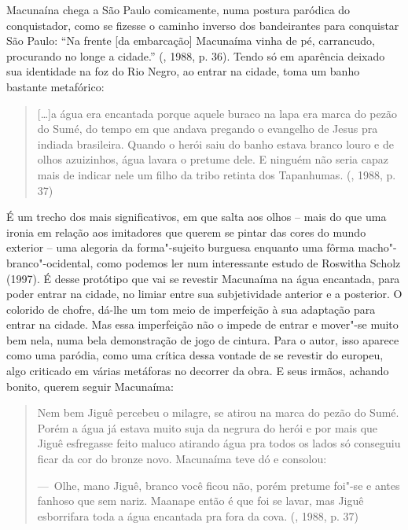 Macunaína chega a São Paulo comicamente, numa postura paródica do
conquistador, como se fizesse o caminho inverso dos bandeirantes para
conquistar São Paulo: ``Na frente [da embarcação] Macunaíma vinha de
pé, carrancudo, procurando no longe a cidade.'' (, 1988, p. 36).
Tendo só em aparência deixado sua identidade na foz do Rio Negro, ao
entrar na cidade, toma um banho bastante metafórico:

\begin{quote}
[\ldots{}]a água era encantada porque aquele buraco na lapa era marca do
pezão do Sumé, do tempo em que andava pregando o evangelho de Jesus pra
indiada brasileira. Quando o herói saiu do banho estava branco louro e
de olhos azuizinhos, água lavara o pretume dele. E ninguém não seria
capaz mais de indicar nele um filho da tribo retinta dos Tapanhumas.
(, 1988, p. 37)
\end{quote}

É um trecho dos mais significativos, em que salta aos olhos -- mais do
que uma ironia em relação aos imitadores que querem se pintar das cores
do mundo exterior -- uma alegoria da forma"-sujeito burguesa enquanto uma
fôrma macho"-branco"-ocidental, como podemos ler num interessante estudo
de Roswitha Scholz (1997). É desse protótipo que vai se revestir
Macunaíma na água encantada, para poder entrar na cidade, no limiar
entre sua subjetividade anterior e a posterior. O colorido de chofre,
dá-lhe um tom meio de imperfeição à sua adaptação para entrar na cidade.
Mas essa imperfeição não o impede de entrar e mover"-se muito bem nela,
numa bela demonstração de jogo de cintura. Para o autor, isso aparece
como uma paródia, como uma crítica dessa vontade de se revestir do
europeu, algo criticado em várias metáforas no decorrer da obra. E seus
irmãos, achando bonito, querem seguir Macunaíma:

\begin{quote}
Nem bem Jiguê percebeu o milagre, se atirou na marca do pezão do Sumé.
Porém a água já estava muito suja da negrura do herói e por mais que
Jiguê esfregasse feito maluco atirando água pra todos os lados só
conseguiu ficar da cor do bronze novo. Macunaíma teve dó e consolou:

---~Olhe, mano Jiguê, branco você ficou não, porém pretume foi"-se e
antes fanhoso que sem nariz. Maanape então é que foi se lavar, mas Jiguê
esborrifara toda a água encantada pra fora da cova. (, 1988, p.
37)
\end{quote}

